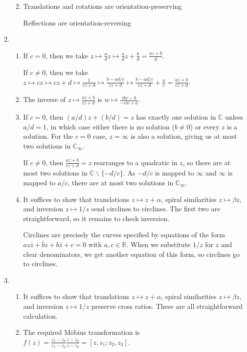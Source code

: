\begin{enumerate}
\begin{enumerate}
\begin{equation*}
\end{equation*}
\item Translations and rotations are orientation-preserving\par
Reflections are orientation-reversing
\end{enumerate}
\item \begin{enumerate}
\item If $c = 0$, then we take $z\mapsto\frac{a}{d}z\mapsto\frac{a}{d}z + \frac{b}{d} = \frac{az + b}{d}$.\par
If $c\neq 0$, then we take $z\mapsto cz\mapsto cz + d\mapsto\frac{1}{cz + d}\mapsto\frac{b - ad/c}{cz + d}\mapsto\frac{b - ad/c}{cz + d} + \frac{a}{c} = \frac{az + b}{cz + d}$.
\item The inverse of $z\mapsto\frac{az + b}{cz + d}$ is $w\mapsto\frac{dw - b}{-cw + a}$.
\item If $c = 0$, then $(a/d)z + (b/d) = z$ has exactly one solution in $\mathbb{C}$ unless $a/d = 1$, in which case either there is no solution ($b\neq 0$) or every $z$ is a solution. For the $c = 0$ case, $z = \infty$ is also a solution, giving us at most two solutions in $\mathbb{C}_{\infty}$.\par
If $c\neq 0$, then $\frac{az + b}{cz + d} = z$ rearranges to a quadratic in $z$, so there are at most two solutions in $\mathbb{C}\backslash\{-d/c\}$. As $-d/c$ is mapped to $\infty$ and $\infty$ is mapped to $a/c$, there are at most two solutions in $\mathbb{C}_{\infty}$.
\item It suffices to show that translations $z\mapsto z + \alpha$, spiral similarities $z\mapsto\beta z$, and inversion $z\mapsto 1/z$ send circlines to circlines. The first two are straightforward, so it remains to check inversion.\par
Circlines are precisely the curves specified by equations of the form $az\bar{z} + \bar{b}z + b\bar{z} + c = 0$ with $a,c\in\mathbb{R}$. When we substitute $1/z$ for $z$ and clear denominators, we get another equation of this form, so circlines go to circlines.
\end{enumerate}
\item \begin{enumerate}
\item It suffices to show that translations $z\mapsto z + \alpha$, spiral similarities $z\mapsto\beta z$, and inversion $z\mapsto 1/z$ preserve cross ratios. These are all straightforward calculation.
\item The required M\"{o}bius transformation is $f(z) = \frac{z_1 - z_3}{z_1 - z_2}\frac{z - z_2}{z - z_3} = [z,z_1;z_2,z_3]$.

\end{enumerate}
\end{enumerate}
